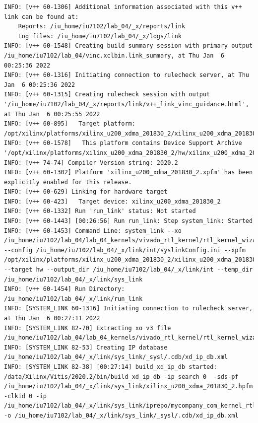 \begin{lstlisting}[label=code, basicstyle=\tiny, caption=Листинг файла v++\_vinc.log]
INFO: [v++ 60-1306] Additional information associated with this v++ link can be found at:
	Reports: /iu_home/iu7102/lab_04/_x/reports/link
	Log files: /iu_home/iu7102/lab_04/_x/logs/link
INFO: [v++ 60-1548] Creating build summary session with primary output /iu_home/iu7102/lab_04/vinc.xclbin.link_summary, at Thu Jan  6 00:25:36 2022
INFO: [v++ 60-1316] Initiating connection to rulecheck server, at Thu Jan  6 00:25:36 2022
INFO: [v++ 60-1315] Creating rulecheck session with output '/iu_home/iu7102/lab_04/_x/reports/link/v++_link_vinc_guidance.html', at Thu Jan  6 00:25:55 2022
INFO: [v++ 60-895]   Target platform: /opt/xilinx/platforms/xilinx_u200_xdma_201830_2/xilinx_u200_xdma_201830_2.xpfm
INFO: [v++ 60-1578]   This platform contains Device Support Archive '/opt/xilinx/platforms/xilinx_u200_xdma_201830_2/hw/xilinx_u200_xdma_201830_2.dsa'
INFO: [v++ 74-74] Compiler Version string: 2020.2
INFO: [v++ 60-1302] Platform 'xilinx_u200_xdma_201830_2.xpfm' has been explicitly enabled for this release.
INFO: [v++ 60-629] Linking for hardware target
INFO: [v++ 60-423]   Target device: xilinx_u200_xdma_201830_2
INFO: [v++ 60-1332] Run 'run_link' status: Not started
INFO: [v++ 60-1443] [00:26:56] Run run_link: Step system_link: Started
INFO: [v++ 60-1453] Command Line: system_link --xo /iu_home/iu7102/lab_04/lab_04_kernels/vivado_rtl_kernel/rtl_kernel_wizard_0_ex/exports/rtl_kernel_wizard_0.xo --config /iu_home/iu7102/lab_04/_x/link/int/syslinkConfig.ini --xpfm /opt/xilinx/platforms/xilinx_u200_xdma_201830_2/xilinx_u200_xdma_201830_2.xpfm --target hw --output_dir /iu_home/iu7102/lab_04/_x/link/int --temp_dir /iu_home/iu7102/lab_04/_x/link/sys_link
INFO: [v++ 60-1454] Run Directory: /iu_home/iu7102/lab_04/_x/link/run_link
INFO: [SYSTEM_LINK 60-1316] Initiating connection to rulecheck server, at Thu Jan  6 00:27:11 2022
INFO: [SYSTEM_LINK 82-70] Extracting xo v3 file /iu_home/iu7102/lab_04/lab_04_kernels/vivado_rtl_kernel/rtl_kernel_wizard_0_ex/exports/rtl_kernel_wizard_0.xo
INFO: [SYSTEM_LINK 82-53] Creating IP database /iu_home/iu7102/lab_04/_x/link/sys_link/_sysl/.cdb/xd_ip_db.xml
INFO: [SYSTEM_LINK 82-38] [00:27:14] build_xd_ip_db started: /data/Xilinx/Vitis/2020.2/bin/build_xd_ip_db -ip_search 0  -sds-pf /iu_home/iu7102/lab_04/_x/link/sys_link/xilinx_u200_xdma_201830_2.hpfm -clkid 0 -ip /iu_home/iu7102/lab_04/_x/link/sys_link/iprepo/mycompany_com_kernel_rtl_kernel_wizard_0_1_0,rtl_kernel_wizard_0 -o /iu_home/iu7102/lab_04/_x/link/sys_link/_sysl/.cdb/xd_ip_db.xml

\end{lstlisting}
